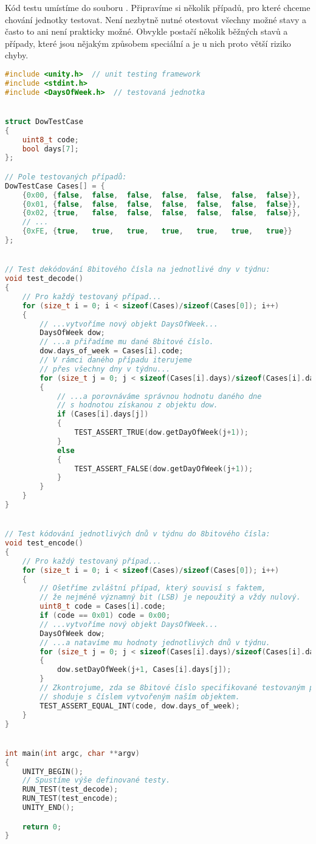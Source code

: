 Kód testu umístíme do souboru
. Připravíme si několik
případů, pro které chceme chování jednotky testovat. Není nezbytně nutné
otestovat všechny možné stavy a často to ani není prakticky možné. Obvykle
postačí několik běžných stavů a případy, které jsou nějakým způsobem speciální
a je u nich proto větší riziko chyby.
\begin{lstlisting}[language=C++,style=numbers,breakatwhitespace=true]
#include <unity.h>  // unit testing framework
#include <stdint.h>
#include <DaysOfWeek.h>  // testovaná jednotka


struct DowTestCase
{
    uint8_t code;
    bool days[7];
};

// Pole testovaných případů:
DowTestCase Cases[] = {
    {0x00, {false,  false,  false,  false,  false,  false,  false}},
    {0x01, {false,  false,  false,  false,  false,  false,  false}},
    {0x02, {true,   false,  false,  false,  false,  false,  false}},
    // ...
    {0xFE, {true,   true,   true,   true,   true,   true,   true}}
};


// Test dekódování 8bitového čísla na jednotlivé dny v týdnu:
void test_decode()
{
    // Pro každý testovaný případ...
    for (size_t i = 0; i < sizeof(Cases)/sizeof(Cases[0]); i++)
    {
        // ...vytvoříme nový objekt DaysOfWeek...
        DaysOfWeek dow;
        // ...a přiřadíme mu dané 8bitové číslo.
        dow.days_of_week = Cases[i].code;
        // V rámci daného případu iterujeme
        // přes všechny dny v týdnu...
        for (size_t j = 0; j < sizeof(Cases[i].days)/sizeof(Cases[i].days[0]); j++)
        {
            // ...a porovnáváme správnou hodnotu daného dne
            // s hodnotou získanou z objektu dow.
            if (Cases[i].days[j])
            {
                TEST_ASSERT_TRUE(dow.getDayOfWeek(j+1));
            }
            else
            {
                TEST_ASSERT_FALSE(dow.getDayOfWeek(j+1));
            }
        }
    }
}


// Test kódování jednotlivých dnů v týdnu do 8bitového čísla:
void test_encode()
{
    // Pro každý testovaný případ...
    for (size_t i = 0; i < sizeof(Cases)/sizeof(Cases[0]); i++)
    {
        // Ošetříme zvláštní případ, který souvisí s faktem,
        // že nejméně významný bit (LSB) je nepoužitý a vždy nulový.
        uint8_t code = Cases[i].code;
        if (code == 0x01) code = 0x00;
        // ...vytvoříme nový objekt DaysOfWeek...
        DaysOfWeek dow;
        // ...a natavíme mu hodnoty jednotlivých dnů v týdnu.
        for (size_t j = 0; j < sizeof(Cases[i].days)/sizeof(Cases[i].days[0]); j++)
        {
            dow.setDayOfWeek(j+1, Cases[i].days[j]);
        }
        // Zkontrojume, zda se 8bitové číslo specifikované testovaným případem
        // shoduje s číslem vytvořeným naším objektem.
        TEST_ASSERT_EQUAL_INT(code, dow.days_of_week);
    }
}


int main(int argc, char **argv)
{
    UNITY_BEGIN();
    // Spustíme výše definované testy.
    RUN_TEST(test_decode);
    RUN_TEST(test_encode);
    UNITY_END();

    return 0;
}
\end{lstlisting}

